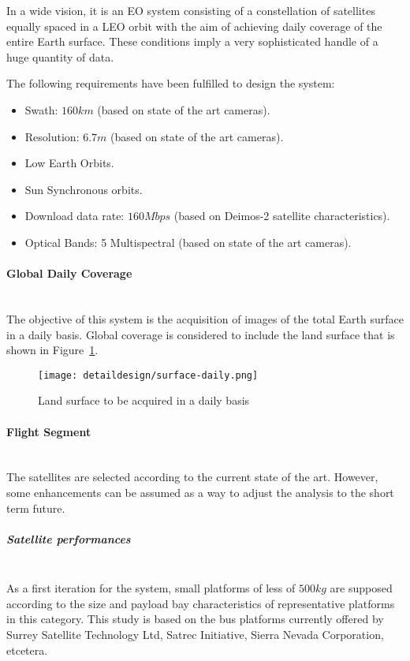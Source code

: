 In a wide vision, it is an \acs{EO} system consisting of a constellation of satellites equally spaced in a \acs{LEO} orbit with the aim of achieving daily coverage of the entire Earth surface. These conditions imply a very sophisticated handle of a huge quantity of data.

The following requirements have been fulfilled to design the system:
\begin{itemize}
\item Swath: $160km$ (based on state of the art cameras).
\item Resolution: $6.7m$ (based on state of the art cameras).
\item Low Earth Orbits.
\item Sun Synchronous orbits.
\item Download data rate: $160 Mbps$ (based on Deimos-2 satellite characteristics).
\item Optical Bands: 5 Multispectral (based on state of the art cameras).
\end{itemize}

\paragraph{Global Daily Coverage}~\\
The objective of this system is the acquisition of images of the total Earth surface in a daily basis. Global coverage is considered to include the land surface that is shown in Figure~\ref{fig:intr-land-surface}.


\begin{figure}[!h]
\begin{center}
\texttt{[image: detaildesign/surface-daily.png]}
\caption{Land surface to be acquired in a daily basis}
\label{fig:intr-land-surface}
\end{center}
\end{figure}


\paragraph{Flight Segment}~\\
The satellites are selected according to the current state of the art. However,
some enhancements can be assumed as a way to adjust the analysis to the short
term future.


\subparagraph{Satellite performances}~\\
As a first iteration for the system, small platforms of less of $500kg$ are supposed according to the size and payload bay characteristics of representative platforms in this category. This study is based on the bus platforms currently offered by Surrey Satellite Technology Ltd, Satrec Initiative, Sierra Nevada Corporation, etcetera.

